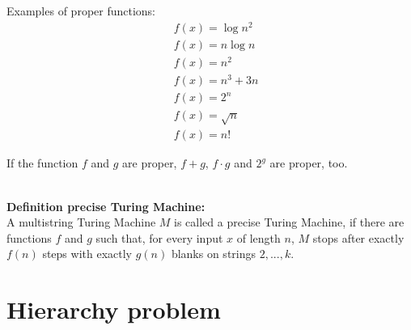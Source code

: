 \documentclass[a4]{scrartcl}
\begin{document}
Examples of proper functions: \cite{book} 
\begin{align*}
\ & f(x) = \log n^2 \\
\ & f(x) = n \log n \\
\ & f(x) = n^2 \\
\ & f(x) = n^3 +3n \\
\ & f(x) = 2^n \\
\ & f(x) = \sqrt{n} \\
\ & f(x) = n!
\end{align*}

If the function $f$ and $g$ are proper, $f+g$, $f \cdot g$ and $2^g$ are proper, too.

\ \\
\textbf{Definition precise Turing Machine:} \cite{book, CC} \\
A multistring Turing Machine $M$ is called a precise Turing Machine, if there are functions $f$ and $g$ such that, for every input $x$ of length $n$, $M$ stops after exactly $f(n)$ steps with exactly $g(n)$ blanks on strings $2, . . . , k$.



















\section*{Hierarchy problem}



\newpage

\printbibliography
\end{document}
